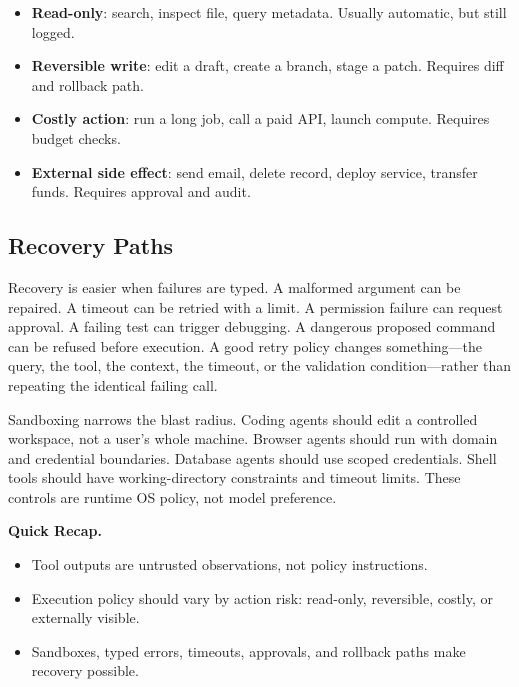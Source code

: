 \begin{tcolorbox}[colback=orange!8, colframe=orange!65!black, title=\textbf{Action Risk Levels}]
\begin{itemize}[nosep,leftmargin=1.5em]
  \item \textbf{Read-only}: search, inspect file, query metadata. Usually automatic, but still logged.
  \item \textbf{Reversible write}: edit a draft, create a branch, stage a patch. Requires diff and rollback path.
  \item \textbf{Costly action}: run a long job, call a paid API, launch compute. Requires budget checks.
  \item \textbf{External side effect}: send email, delete record, deploy service, transfer funds. Requires approval and audit.
\end{itemize}
\end{tcolorbox}

\subsection{Recovery Paths}

Recovery is easier when failures are typed. A malformed argument can be repaired. A timeout can be retried with a limit. A permission failure can request approval. A failing test can trigger debugging. A dangerous proposed command can be refused before execution. A good retry policy changes something---the query, the tool, the context, the timeout, or the validation condition---rather than repeating the identical failing call.

Sandboxing narrows the blast radius. Coding agents should edit a controlled workspace, not a user's whole machine. Browser agents should run with domain and credential boundaries. Database agents should use scoped credentials. Shell tools should have working-directory constraints and timeout limits. These controls are runtime OS policy, not model preference.

\begin{quickrecap}
\textbf{Quick Recap.}
\begin{itemize}[nosep,leftmargin=1.5em]
  \item Tool outputs are untrusted observations, not policy instructions.
  \item Execution policy should vary by action risk: read-only, reversible, costly, or externally visible.
  \item Sandboxes, typed errors, timeouts, approvals, and rollback paths make recovery possible.
\end{itemize}
\end{quickrecap}


